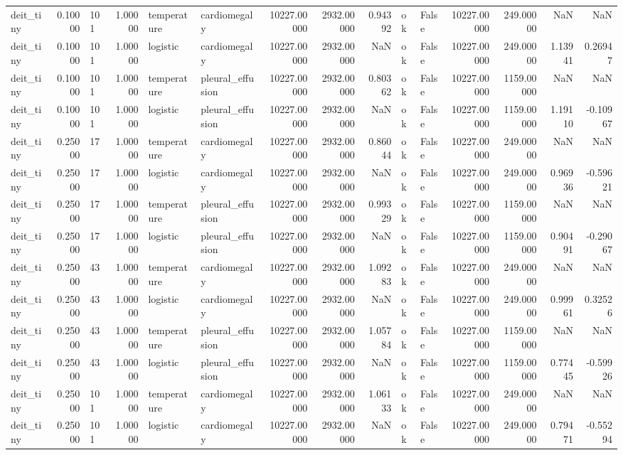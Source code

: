 \begin{tabular}{lrlrllrrrllrrrr}
deit\_tiny & 0.10000 & 101 & 1.00000 & temperature & cardiomegaly & 10227.00000 & 2932.00000 & 0.94392 & ok & False & 10227.00000 & 249.00000 & NaN & NaN \\
deit\_tiny & 0.10000 & 101 & 1.00000 & logistic & cardiomegaly & 10227.00000 & 2932.00000 & NaN & ok & False & 10227.00000 & 249.00000 & 1.13941 & 0.26947 \\
deit\_tiny & 0.10000 & 101 & 1.00000 & temperature & pleural\_effusion & 10227.00000 & 2932.00000 & 0.80362 & ok & False & 10227.00000 & 1159.00000 & NaN & NaN \\
deit\_tiny & 0.10000 & 101 & 1.00000 & logistic & pleural\_effusion & 10227.00000 & 2932.00000 & NaN & ok & False & 10227.00000 & 1159.00000 & 1.19110 & -0.10967 \\
deit\_tiny & 0.25000 & 17 & 1.00000 & temperature & cardiomegaly & 10227.00000 & 2932.00000 & 0.86044 & ok & False & 10227.00000 & 249.00000 & NaN & NaN \\
deit\_tiny & 0.25000 & 17 & 1.00000 & logistic & cardiomegaly & 10227.00000 & 2932.00000 & NaN & ok & False & 10227.00000 & 249.00000 & 0.96936 & -0.59621 \\
deit\_tiny & 0.25000 & 17 & 1.00000 & temperature & pleural\_effusion & 10227.00000 & 2932.00000 & 0.99329 & ok & False & 10227.00000 & 1159.00000 & NaN & NaN \\
deit\_tiny & 0.25000 & 17 & 1.00000 & logistic & pleural\_effusion & 10227.00000 & 2932.00000 & NaN & ok & False & 10227.00000 & 1159.00000 & 0.90491 & -0.29067 \\
deit\_tiny & 0.25000 & 43 & 1.00000 & temperature & cardiomegaly & 10227.00000 & 2932.00000 & 1.09283 & ok & False & 10227.00000 & 249.00000 & NaN & NaN \\
deit\_tiny & 0.25000 & 43 & 1.00000 & logistic & cardiomegaly & 10227.00000 & 2932.00000 & NaN & ok & False & 10227.00000 & 249.00000 & 0.99961 & 0.32526 \\
deit\_tiny & 0.25000 & 43 & 1.00000 & temperature & pleural\_effusion & 10227.00000 & 2932.00000 & 1.05784 & ok & False & 10227.00000 & 1159.00000 & NaN & NaN \\
deit\_tiny & 0.25000 & 43 & 1.00000 & logistic & pleural\_effusion & 10227.00000 & 2932.00000 & NaN & ok & False & 10227.00000 & 1159.00000 & 0.77445 & -0.59926 \\
deit\_tiny & 0.25000 & 101 & 1.00000 & temperature & cardiomegaly & 10227.00000 & 2932.00000 & 1.06133 & ok & False & 10227.00000 & 249.00000 & NaN & NaN \\
deit\_tiny & 0.25000 & 101 & 1.00000 & logistic & cardiomegaly & 10227.00000 & 2932.00000 & NaN & ok & False & 10227.00000 & 249.00000 & 0.79471 & -0.55294 \\

\end{tabular}

